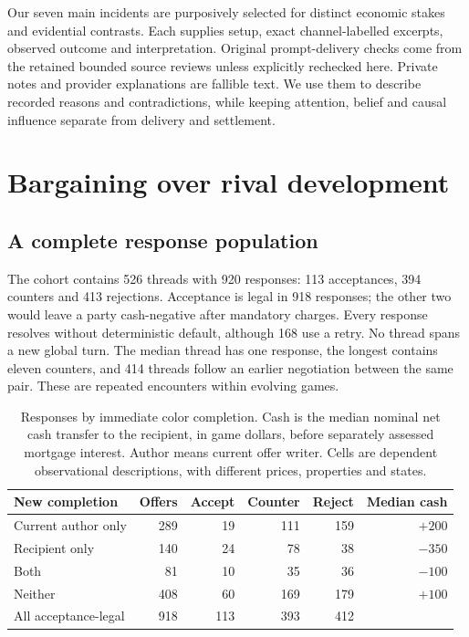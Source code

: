 \documentclass[11pt,letterpaper]{article}
\begin{document}
Our seven main incidents are purposively selected for distinct economic stakes and evidential contrasts. Each supplies setup, exact channel-labelled excerpts, observed outcome and interpretation. Original prompt-delivery checks come from the retained bounded source reviews unless explicitly rechecked here. Private notes and provider explanations are fallible text. We use them to describe recorded reasons and contradictions, while keeping attention, belief and causal influence separate from delivery and settlement.

\section{Bargaining over rival development}

\subsection{A complete response population}

The cohort contains 526 threads with 920 responses: 113 acceptances, 394 counters and 413 rejections. Acceptance is legal in 918 responses; the other two would leave a party cash-negative after mandatory charges. Every response resolves without deterministic default, although 168 use a retry. No thread spans a new global turn. The median thread has one response, the longest contains eleven counters, and 414 threads follow an earlier negotiation between the same pair. These are repeated encounters within evolving games.

\begin{table}[t]
\centering\small
\begin{tabular}{lrrrrr}
\toprule New completion & Offers & Accept & Counter & Reject & Median cash\\\midrule
Current author only & 289 & 19 & 111 & 159 & $+200$\\
Recipient only & 140 & 24 & 78 & 38 & $-350$\\
Both & 81 & 10 & 35 & 36 & $-100$\\
Neither & 408 & 60 & 169 & 179 & $+100$\\\midrule
All acceptance-legal & 918 & 113 & 393 & 412 & \\\bottomrule
\end{tabular}
\caption{Responses by immediate color completion. Cash is the median nominal net cash transfer to the recipient, in game dollars, before separately assessed mortgage interest. Author means current offer writer. Cells are dependent observational descriptions, with different prices, properties and states.}
\label{tab:offers}
\end{table}
\end{document}
